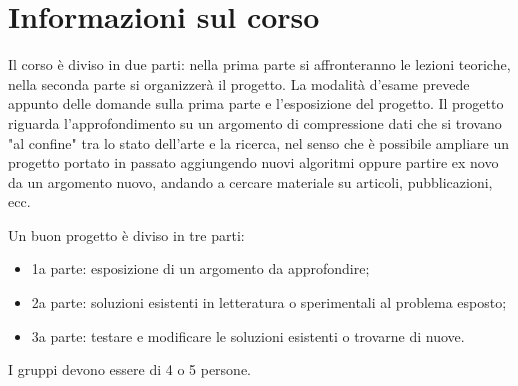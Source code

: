 \setcounter{chapter}{-1}
\chapter{Informazioni sul corso}
Il corso è diviso in due parti: nella prima parte si affronteranno le lezioni teoriche, nella seconda parte si organizzerà il progetto. La modalità d'esame prevede appunto delle domande sulla prima parte e l'esposizione del progetto. Il progetto riguarda l'approfondimento su un argomento di compressione dati che si trovano "al confine" tra lo stato dell'arte e la ricerca, nel senso che è possibile ampliare un progetto portato in passato aggiungendo nuovi algoritmi oppure partire ex novo da un argomento nuovo, andando a cercare materiale su articoli, pubblicazioni, ecc.

Un buon progetto è diviso in tre parti:
\begin{itemize}
    \item 1a parte: esposizione di un argomento da approfondire;
    \item 2a parte: soluzioni esistenti in letteratura o sperimentali al problema esposto;
    \item 3a parte: testare e modificare le soluzioni esistenti o trovarne di nuove.
\end{itemize}
I gruppi devono essere di 4 o 5 persone.


\let\cleardoublepage\clearpage